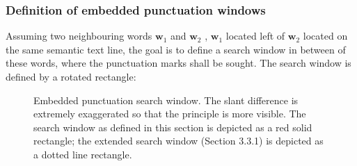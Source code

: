 \documentclass[12pt,a4paper]{report}
\begin{document}
\subsubsection{Definition of embedded punctuation windows}
Assuming two neighbouring words $\mathbf{w}_1$ and $\mathbf{w}_2$ , $\mathbf{w}_1$ located left of $\mathbf{w}_2$ located on the same semantic text line, the goal is to define a search window in between of these words, where the punctuation marks shall be sought. The search window is defined by a rotated rectangle:

\begin{figure}[htbp]
    \centering
    \caption{Embedded punctuation search window. The slant difference is extremely exaggerated so that the principle is more visible. The search window as defined in this section is depicted as a red solid rectangle; the extended search window (Section 3.3.1) is depicted as a dotted line rectangle.}
    \label{fig:embedded-window}
\end{figure}
\end{document}
